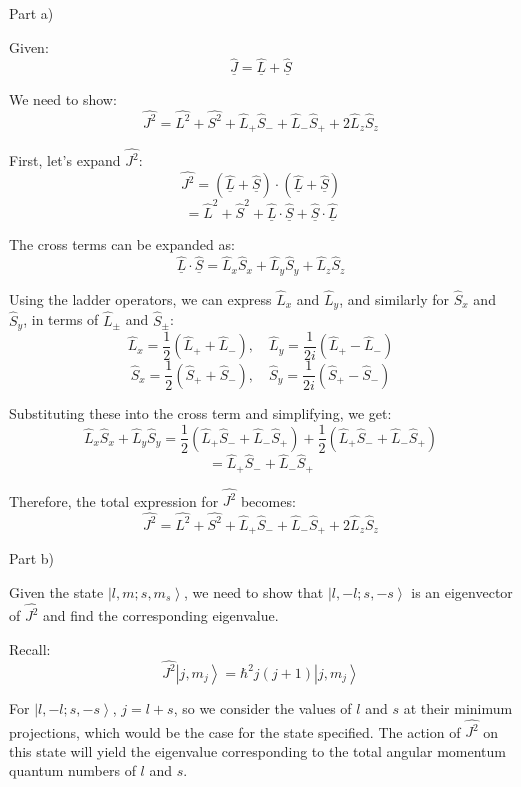 Part a)

Given:
\[ \hat{\underline{J}} = \hat{\underline{L}} + \hat{\underline{S}} \]

We need to show:
\[ \hat{J^{2}} = \hat{L^{2}} + \hat{S^{2}} + \hat{L}_{+}\hat{S}_{-} + \hat{L}_{-}\hat{S}_{+} + 2\hat{L}_{z}\hat{S}_{z} \]

First, let's expand \(\hat{J^{2}}\):
\[ \hat{J^{2}} = (\hat{\underline{L}} + \hat{\underline{S}}) \cdot (\hat{\underline{L}} + \hat{\underline{S}}) \]
\[ = \hat{L}^2 + \hat{S}^2 + \hat{\underline{L}}\cdot\hat{\underline{S}} + \hat{\underline{S}}\cdot\hat{\underline{L}} \]

The cross terms can be expanded as:
\[ \hat{\underline{L}}\cdot\hat{\underline{S}} = \hat{L}_{x}\hat{S}_{x} + \hat{L}_{y}\hat{S}_{y} + \hat{L}_{z}\hat{S}_{z} \]

Using the ladder operators, we can express \(\hat{L}_{x}\) and \(\hat{L}_{y}\), and similarly for \(\hat{S}_{x}\) and \(\hat{S}_{y}\), in terms of \(\hat{L}_{\pm}\) and \(\hat{S}_{\pm}\):
\[ \hat{L}_{x} = \frac{1}{2}(\hat{L}_{+} + \hat{L}_{-}), \quad \hat{L}_{y} = \frac{1}{2i}(\hat{L}_{+} - \hat{L}_{-}) \]
\[ \hat{S}_{x} = \frac{1}{2}(\hat{S}_{+} + \hat{S}_{-}), \quad \hat{S}_{y} = \frac{1}{2i}(\hat{S}_{+} - \hat{S}_{-}) \]

Substituting these into the cross term and simplifying, we get:
\[ \hat{L}_{x}\hat{S}_{x} + \hat{L}_{y}\hat{S}_{y} = \frac{1}{2}(\hat{L}_{+}\hat{S}_{-} + \hat{L}_{-}\hat{S}_{+}) + \frac{1}{2}(\hat{L}_{+}\hat{S}_{-} + \hat{L}_{-}\hat{S}_{+}) \]
\[ = \hat{L}_{+}\hat{S}_{-} + \hat{L}_{-}\hat{S}_{+} \]

Therefore, the total expression for \(\hat{J^{2}}\) becomes:
\[ \hat{J^{2}} = \hat{L^{2}} + \hat{S^{2}} + \hat{L}_{+}\hat{S}_{-} + \hat{L}_{-}\hat{S}_{+} + 2\hat{L}_{z}\hat{S}_{z} \]

Part b)

Given the state \(\left|l, m; s, m_{s} \right>\), we need to show that \(\left|l, -l; s, -s \right>\) is an eigenvector of \(\hat{J^{2}}\) and find the corresponding eigenvalue.

Recall:
\[ \hat{J^{2}}\left|j, m_j\right> = \hbar^2 j(j+1)\left|j, m_j\right> \]

For \(\left|l, -l; s, -s \right>\), \(j = l + s\), so we consider the values of \(l\) and \(s\) at their minimum projections, which would be the case for the state specified. The action of \(\hat{J^2}\) on this state will yield the eigenvalue corresponding to the total angular momentum quantum numbers of \(l\) and \(s\).

